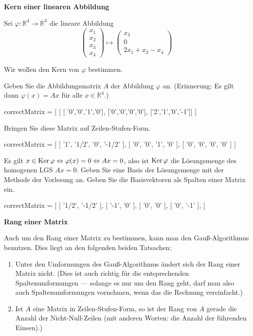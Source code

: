 \documentclass{ximera}
\begin{document}
\textbf{Kern einer linearen Abbildung}


Sei $\varphi\colon \mathbb R^4 \rightarrow \mathbb R^3$ die lineare Abbildung
\[
\left(
\begin{array}{c}
x_1 \\ x_2 \\ x_3 \\ x_4
\end{array}
\right)
\mapsto
\left(
\begin{array}{c}
x_3 \\ 0 \\ 2x_1 + x_2 - x_4
\end{array}
\right)
\]

\begin{question}
Wir wollen den Kern von $\varphi$ bestimmen.

\begin{solution}
Geben Sie die Abbildungsmatrix $A$ der Abbildung $\varphi$ an. (Erinnerung: Es gilt dann $\varphi(x) = Ax$ für alle $x\in \mathbb R^4$.)
\begin{matrix-answer}
correctMatrix = [
[ [ '0','0','1','0'], ['0','0','0','0'], ['2','1','0','-1']]
]
\end{matrix-answer}
\end{solution}

\begin{solution}
Bringen Sie diese Matrix auf Zeilen-Stufen-Form.
\begin{matrix-answer}
correctMatrix = [
[ '1', '1/2', '0', '-1/2' ], [ '0', '0', '1', '0' ], [ '0', '0', '0', '0' ]
]
\end{matrix-answer}
\end{solution}

\begin{solution}
Es gilt $x\in \mathop{\rm Ker}\varphi \Leftrightarrow \varphi(x) = 0 \Leftrightarrow Ax=0$, also ist $\mathop{\rm Ker}\varphi$ die Lösungsmenge des homogenen LGS $Ax=0$. Geben Sie eine Basis der Lösungsmenge mit der Methode der Vorlesung an. Geben Sie die Basisvektoren als Spalten einer Matrix ein.
\begin{matrix-answer}
correctMatrix = [
[  '1/2', '-1/2' ],
[  '-1', '0' ],
[  '0', '0' ],
[  '0', '-1' ],
] 
\end{matrix-answer}
\end{solution}
\end{question}


\textbf{Rang einer Matrix}

Auch um den Rang einer Matrix zu bestimmen, kann man den Gauß-Algorithmus benutzen. Dies liegt an den folgenden beiden Tatsachen:
\begin{enumerate}
\item
Unter den Umformungen des Gauß-Algorithmus ändert sich der Rang einer Matrix nicht. (Dies ist auch richtig für die entsprechenden Spaltenumformungen --- solange es nur um den Rang geht, darf man also auch Spaltenumformungen vornehmen, wenn das die Rechnung vereinfacht.)
\item
Ist $A$ eine Matrix in Zeilen-Stufen-Form, so ist der Rang von $A$ gerade die Anzahl der Nicht-Null-Zeilen (mit anderen Worten: die Anzahl der führenden Einsen).)
\end{enumerate}
\end{document}
